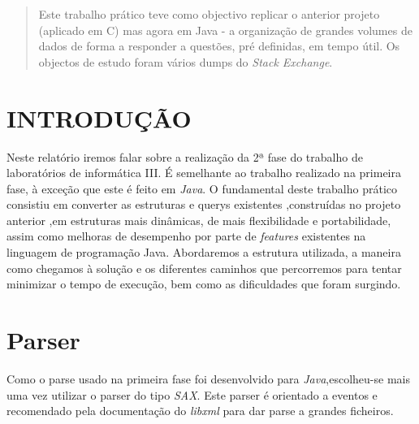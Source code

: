 \author{Adriana Meireles (a82582), Eduardo Jorge Barbosa (a83344), Filipe Monteiro (a80229)%
}






\maketitle
\thispagestyle{empty}
\pagestyle{empty}


\begin{abstract}

Este trabalho prático teve como objectivo replicar o anterior projeto (aplicado em C) mas agora em Java - a organização de grandes volumes de dados de forma a responder a questões, pré definidas, em tempo útil. Os objectos de estudo foram vários dumps do \textit{Stack Exchange}.

\end{abstract}


\section{INTRODUÇÃO}

Neste relatório iremos falar sobre a realização da 2ª fase do trabalho de laboratórios de informática III.
É semelhante ao trabalho realizado na primeira fase, à exceção que este é feito em \textit{Java}.
\newline
O fundamental deste trabalho prático consistiu em converter as estruturas e querys existentes ,construídas no projeto anterior ,em estruturas mais dinâmicas, de mais flexibilidade e portabilidade, assim como melhoras de desempenho por parte de \textit{features} existentes na linguagem de programação Java.
\newline
Abordaremos a estrutura utilizada, a maneira como chegamos à solução e os diferentes caminhos que percorremos para tentar minimizar o tempo de execução, bem como as dificuldades que foram surgindo.

\section{Parser}

Como o parse usado na primeira fase foi desenvolvido para \textit{Java},escolheu-se mais uma vez utilizar o parser do tipo \textit{SAX}. Este parser é orientado a eventos e recomendado pela documentação do \textit{libxml} para dar parse a grandes ficheiros.

